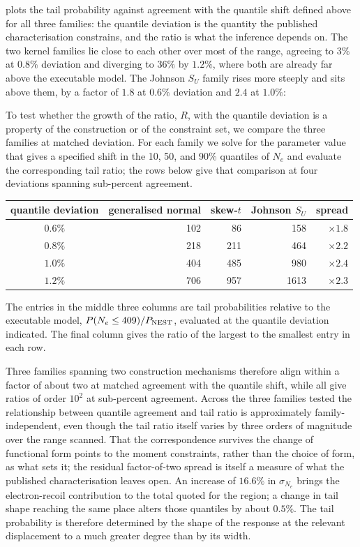 \documentclass[11pt,a4paper]{article}
\begin{document}
 plots the tail probability against agreement with the
quantile shift defined above for all three families: the quantile
deviation is the quantity the published characterisation constrains, and
the ratio is what the inference depends on. The two kernel families lie
close to each other over most of the range, agreeing to \(3\%\) at
\(0.8\%\) deviation and diverging to \(36\%\) by \(1.2\%\), where both
are already far above the executable model. The Johnson \(S_U\) family rises more steeply and
sits above them, by a factor of \(1.8\) at \(0.6\%\) deviation and
\(2.4\) at \(1.0\%\):

To test whether the growth of the ratio, \(R\), with the quantile
deviation is a property of the construction or of the constraint set, we
compare the three families at matched deviation. For each family we
solve for the parameter value that gives a specified shift in the 10,
50, and 90\% quantiles of \(N_e\) and evaluate the corresponding tail
ratio; the rows below give that comparison at four deviations spanning
sub-percent agreement. 
\begin{center} 
\begin{tabular}{crrrr} 
\toprule
quantile deviation & generalised normal & skew-\(t\) & Johnson \(S_U\) & spread\\ 
\midrule 
\(0.6\%\) & 102 & 86 & 158 & \(\times1.8\)\\ 
\(0.8\%\) & 218 & 211 & 464 & \(\times2.2\)\\
\(1.0\%\) & 404 & 485 & 980 & \(\times2.4\)\\ 
\(1.2\%\) & 706 & 957 & 1613 & \(\times2.3\)\\ 
\bottomrule 
\end{tabular} 
\end{center}
\noindent The entries in the middle three columns are tail probabilities
relative to the executable model, \(P(N_e\le409)/P_{\rm NEST}\),
evaluated at the quantile deviation indicated. The final column gives
the ratio of the largest to the smallest entry in each row.


Three families spanning two construction mechanisms therefore
align within a factor of about two at matched agreement with the
quantile shift, while all give ratios of order \(10^2\) at sub-percent
agreement. Across the three families tested the relationship between
quantile agreement and tail ratio is approximately family-independent,
even though the tail ratio itself varies by three orders of magnitude
over the range scanned. That the correspondence survives the change of
functional form points to the moment constraints, rather than the choice
of form, as what sets it; the residual factor-of-two spread is itself a
measure of what the published characterisation leaves open. An increase
of \(16.6\%\) in \(\sigma_{N_e}\) brings the electron-recoil
contribution to the total quoted for the region; a change in tail shape
reaching the same place alters those quantiles by about \(0.5\%\). The tail probability is therefore determined by the shape
of the response at the relevant displacement to a much greater degree
than by its width.
\end{document}
